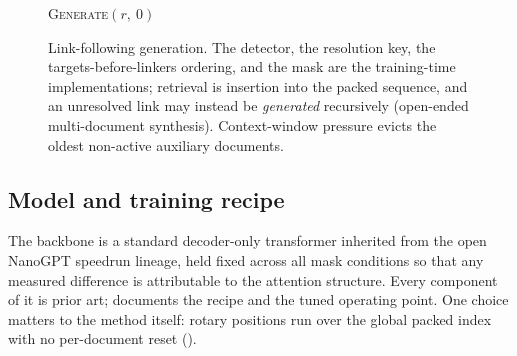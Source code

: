\begin{figure}[t]
\begin{center}
{\begin{minipage}{0.94\linewidth}
\textsc{Generate}$(r,\ 0)$
\end{minipage}}
\end{center}
\caption{Link-following generation. The detector, the resolution key, the
targets-before-linkers ordering, and the mask are the training-time implementations;
retrieval is insertion into the packed sequence, and an unresolved link may instead be
\emph{generated} recursively (open-ended multi-document synthesis). Context-window
pressure evicts the oldest non-active auxiliary documents.}
\label{alg:generation}
\end{figure}

\subsection{Model and training recipe}
\label{sec:method:recipe}

The backbone is a standard decoder-only transformer inherited from the open NanoGPT
speedrun lineage, held fixed across all mask conditions so that any measured
difference is attributable to the attention structure. Every component of it is prior
art;  documents the recipe and  the tuned
operating point. One choice matters to the method itself: rotary positions run over
the global packed index with no per-document reset ().
